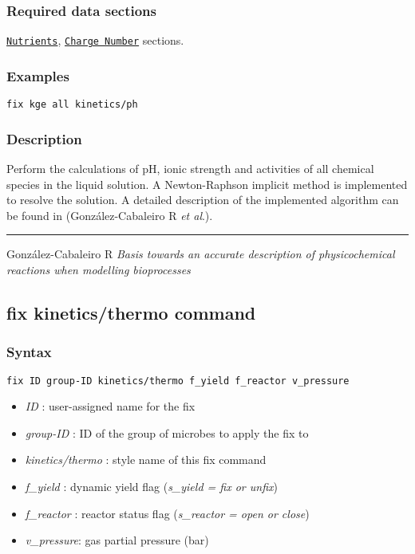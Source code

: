 \documentclass[11pt,a4paper,openright]{article}
\begin{document}
\subsubsection*{Required data sections}
\hyperref[snutrients]{\tt Nutrients},
\hyperref[scharge]{\tt Charge Number}  sections. \\

\subsubsection*{Examples}

\begin{Verbatim}[frame=single]
fix kge all kinetics/ph
\end{Verbatim}

\subsubsection*{Description}

Perform the calculations of pH, ionic strength and activities of all chemical species in the liquid solution.
A Newton-Raphson implicit method is implemented to resolve the solution. 
A detailed description of the implemented algorithm can be found in (González-Cabaleiro R {\it et al}.).

\noindent\rule{13cm}{0.4pt}
González-Cabaleiro R {\it Basis towards an accurate description of physicochemical reactions when modelling bioprocesses}
\newpage


\newpage
\subsection{fix kinetics/thermo command}
\label{fkineticsthermo}

\subsubsection*{Syntax}

\begin{Verbatim}[frame=single]
fix ID group-ID kinetics/thermo f_yield f_reactor v_pressure
\end{Verbatim}

\begin{itemize} [nosep]
\item
	{\it ID }: user-assigned name for the fix
\item
	{\it group-ID }: ID of the group of microbes to apply the fix to
\item
	{\it kinetics/thermo }: style name of this fix command
\item
	{\it f\_yield }: dynamic yield flag ({\it s\_yield = fix or unfix})
\item
	{\it f\_reactor }: reactor status flag ({\it s\_reactor = open or close})
\item
    {\it v\_pressure}: gas partial pressure (bar)
\end{itemize}
\end{document}
